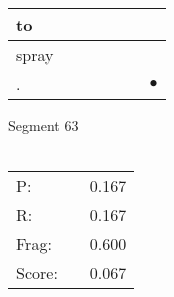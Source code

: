 \documentclass[landscape]{article}
\newcommand{\ssp}{\hspace{2pt}}
\newcommand{\mex}{\cellcolor{g}$\bullet$}
\begin{document}
\begin{tabular}{|l|p{10pt}|p{10pt}|p{10pt}|p{10pt}|p{10pt}|p{10pt}|}
\hline
\ssp to \ssp&\hspace{2pt}&\hspace{2pt}&\hspace{2pt}&\hspace{2pt}&\hspace{2pt}&\hspace{2pt}\\
\hline
\ssp spray \ssp&\hspace{2pt}&\hspace{2pt}&\hspace{2pt}&\hspace{2pt}&\hspace{2pt}&\hspace{2pt}\\
\hline
\ssp \cellcolor{ref5}. \ssp&\hspace{2pt}&\hspace{2pt}&\hspace{2pt}&\hspace{2pt}&\hspace{2pt}&\hspace{2pt}\mex\\
\hline
\end{tabular}

\vspace{6pt}
\noindent Segment 63\\\\
\noindent\begin{tabular}{lm{12pt}r}
\hline
P:&&0.167\\
R:&&0.167\\
Frag:&&0.600\\
Score:&&0.067\\
\end{tabular}

\newpage
\end{document}
